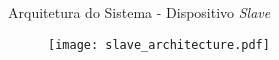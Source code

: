 \begin{frame}{Arquitetura do Sistema - Dispositivo \emph{Slave}}
	\begin{figure}
		\centering
		\texttt{[image: slave\_architecture.pdf]}
	\end{figure}
\end{frame}